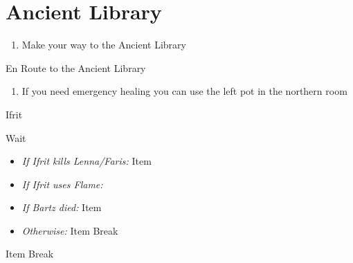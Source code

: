 \newpage

\chapter{Ancient Library}

\vspace{\baselineskip}

\begin{paracol}{2}

\begin{enumerate}
    \item Make your way to the Ancient Library
\end{enumerate}

\switchcolumn
\begin{steproute}{En Route to the Ancient Library}
\end{steproute}

\switchcolumn
\resume
\begin{enumerate}[resume]
    \item If you need emergency healing you can use the left pot in the northern room
\end{enumerate}

\switchcolumnTwice[*]
\begin{boss}{Ifrit}
    \varwb
    \begin{round}{1}
        \bartz Wait
        \begin{itemize}
            \item \textit{If Ifrit kills Lenna/Faris:} Item \then \battleGroup{\phoenixDown}
            \item \textit{If Ifrit uses Flame:} 
        \end{itemize}
        \anyone
        \begin{itemize}
            \item \textit{If Bartz died:} Item \then \battleGroup{\phoenixDown}
            \item \textit{Otherwise:} Item \then {} \then Break
        \end{itemize}
        \anyone Item \then {} \then Break
    \end{round}
    \varwe
\end{boss}


\end{paracol}

